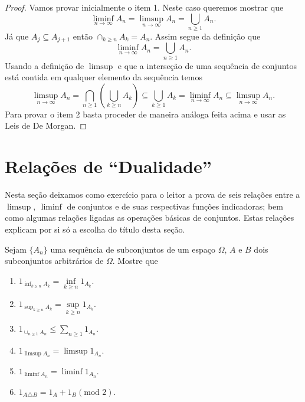 \begin{proof}
Vamos provar inicialmente o item 1. 
Neste caso queremos mostrar que 
%
\[
	\liminf_{n\to\infty} A_n
	= 
	\limsup_{n\to\infty} A_n
	=
	\displaystyle\bigcup_{n\geqslant 1} {A_n}.
\] 
%
Já que $A_j \subseteq A_{j+1}$
então $\cap_{k\geqslant n} {A_k}=A_n$.
Assim segue da definição que 
\[
\liminf_{n\to\infty} A_n 
= 
\bigcup_{n\geqslant 1} {A_n}.
\]
Usando a definição de $\limsup$ e que a interseção de 
uma sequência de conjuntos
está contida em qualquer elemento da sequência temos 
\[
	\limsup_{n\to\infty} A_n 
	=
	\displaystyle\bigcap_{n\geqslant 1} 
		\left(\displaystyle\bigcup_{k\geqslant n}{A_k} \right)
	\subseteq 
	\displaystyle\bigcup_{k\geqslant 1} {A_k} 
	=
	\liminf_{n\to\infty} A_n 
	\subseteq 
	\limsup_{n\to\infty} A_n.
\]
Para provar o item 2 basta proceder de maneira análoga feita acima 
e usar as Leis de De Morgan.
\end{proof}













\section{Relações de ``Dualidade''}

Nesta seção deixamos como exercício para o leitor a prova de
seis relações 
entre a $\limsup,\ \liminf$ de conjuntos e de suas respectivas 
funções indicadoras; bem como algumas relações ligadas as operações
básicas de conjuntos. Estas relações explicam por si só a escolha 
do título desta seção. 

\begin{exercicio}
Sejam $\{A_n\}$ uma sequência de subconjuntos de um espaço $\Omega$, 
$A$ e $B$ dois subconjuntos arbitrários de $\Omega$. Mostre que 
\begin{enumerate}
\item 
$1_{\inf_{k\geqslant n} A_k} = \inf \limits_{k\geqslant n} 1_{A_k}$.

\item
$1_{\sup_{k\geqslant n} A_k} = \sup \limits_{k\geqslant n} 1_{A_k}$.

\item
$1_{\cup_{n\geqslant 1} A_n} 
\leqslant 
\sum \limits_{n \geqslant 1} 1_{A_n}$.

\item
$1_{\limsup A_n} = \limsup 1_{A_n}$.

\item
$1_{\liminf A_n} = \liminf 1_{A_n}$.

\item
$ 1_{A \triangle B} = 1_A + 1_B (\text{mod 2})$.
\end{enumerate}
\end{exercicio}

